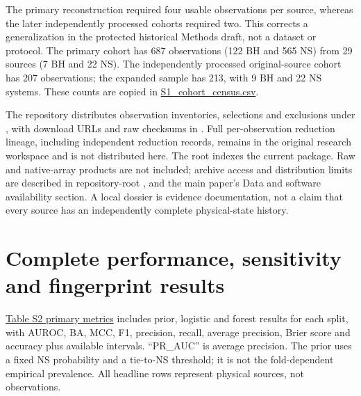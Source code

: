 \documentclass[final,5p,authoryear,nopreprintline]{elsarticle}
\begin{document}
The primary reconstruction required four usable observations per source, whereas the later independently processed cohorts required two. This corrects a generalization in the protected historical Methods draft, not a dataset or protocol. The primary cohort has 687 observations (122 BH and 565 NS) from 29 sources (7 BH and 22 NS). The independently processed original-source cohort has 207 observations; the expanded sample has 213, with 9 BH and 22 NS systems. These counts are copied in \href{https://github.com/YouhanCW/bhns-source-generalization/blob/3c5bb50b1820ef89f816fc2f4da0fb6c69f359f7/manuscript/supplement/tables/S1_cohort_census.csv}{S1\_cohort\_census.csv}.

The repository distributes observation inventories, selections and exclusions under , with download URLs and raw checksums in . Full per-observation reduction lineage, including independent reduction  records, remains in the original research workspace and is not distributed here. The root  indexes the current package. Raw and native-array products are not included; archive access and distribution limits are described in repository-root ,  and the main paper's Data and software availability section. A local dossier is evidence documentation, not a claim that every source has an independently complete physical-state history.

\section{Complete performance, sensitivity and fingerprint results}

\href{https://github.com/YouhanCW/bhns-source-generalization/blob/3c5bb50b1820ef89f816fc2f4da0fb6c69f359f7/manuscript/supplement/tables/S2_primary_metrics.csv}{Table S2 primary metrics} includes prior, logistic and forest results for each split, with AUROC, BA, MCC, F1, precision, recall, average precision, Brier score and accuracy plus available intervals. ``PR\_AUC'' is average precision. The prior uses a fixed NS probability and a tie-to-NS threshold; it is not the fold-dependent empirical prevalence. All headline rows represent physical sources, not observations.
\end{document}
